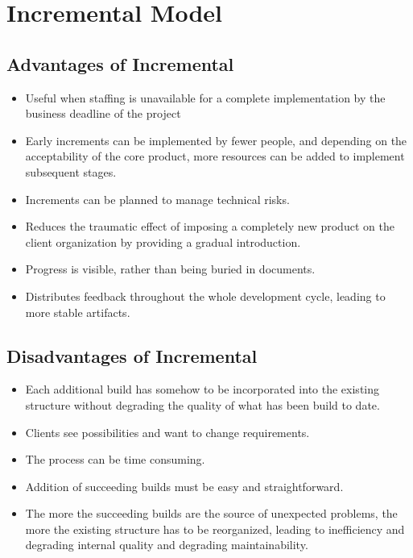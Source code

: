 \documentclass{article}
\begin{document}
\newpage{}
\section{Incremental Model}
\subsection{Advantages of Incremental}
\begin{itemize}
\item        Useful when staffing is unavailable for a complete implementation by the business deadline of the project
\item        Early increments can be implemented by fewer people, and depending on the acceptability of the core product, more resources can be added to implement subsequent stages.
\item        Increments can be planned to manage technical risks.
\item        Reduces the traumatic effect of imposing a completely new product on the client organization by providing a gradual introduction.
\item        Progress is visible, rather than being buried in documents.
\item        Distributes feedback throughout the whole development cycle, leading to more stable artifacts.
\end{itemize}

\subsection{Disadvantages of Incremental}
\begin{itemize}
\item        Each additional build has somehow to be incorporated into the existing structure without degrading the quality of what has been build to date.
\item        Clients see possibilities and want to change requirements.
\item        The process can be time consuming.
\item        Addition of succeeding builds must be easy and straightforward.
\item        The more the succeeding builds are the source of unexpected problems, the more the existing structure has to be reorganized, leading to inefficiency and degrading internal quality and degrading maintainability.
\end{itemize}
\end{document}
